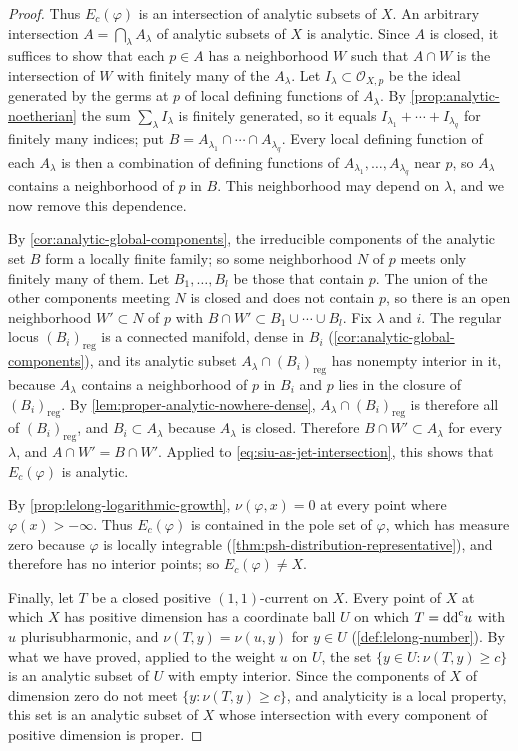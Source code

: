 \begin{proof}
Thus $E_c(\varphi)$ is an intersection of analytic subsets of $X$. An arbitrary intersection $A=\bigcap_\lambda A_\lambda$ of analytic subsets of $X$ is analytic. Since $A$ is closed, it suffices to show that each $p\in A$ has a neighborhood $W$ such that $A\cap W$ is the intersection of $W$ with finitely many of the $A_\lambda$. Let $I_\lambda\subset\mathcal O_{X,p}$ be the ideal generated by the germs at $p$ of local defining functions of $A_\lambda$. By \cref{prop:analytic-noetherian} the sum $\sum_\lambda I_\lambda$ is finitely generated, so it equals $I_{\lambda_1}+\cdots+I_{\lambda_q}$ for finitely many indices; put $B=A_{\lambda_1}\cap\cdots\cap A_{\lambda_q}$. Every local defining function of each $A_\lambda$ is then a combination of defining functions of $A_{\lambda_1},\ldots,A_{\lambda_q}$ near $p$, so $A_\lambda$ contains a neighborhood of $p$ in $B$. This neighborhood may depend on $\lambda$, and we now remove this dependence.

By \cref{cor:analytic-global-components}, the irreducible components of the analytic set $B$ form a locally finite family; so some neighborhood $N$ of $p$ meets only finitely many of them. Let $B_1,\ldots,B_l$ be those that contain $p$. The union of the other components meeting $N$ is closed and does not contain $p$, so there is an open neighborhood $W'\subset N$ of $p$ with $B\cap W'\subset B_1\cup\cdots\cup B_l$. Fix $\lambda$ and $i$. The regular locus $(B_i)_{\mathrm{reg}}$ is a connected manifold, dense in $B_i$ (\cref{cor:analytic-global-components}), and its analytic subset $A_\lambda\cap(B_i)_{\mathrm{reg}}$ has nonempty interior in it, because $A_\lambda$ contains a neighborhood of $p$ in $B_i$ and $p$ lies in the closure of $(B_i)_{\mathrm{reg}}$. By \cref{lem:proper-analytic-nowhere-dense}, $A_\lambda\cap(B_i)_{\mathrm{reg}}$ is therefore all of $(B_i)_{\mathrm{reg}}$, and $B_i\subset A_\lambda$ because $A_\lambda$ is closed. Therefore $B\cap W'\subset A_\lambda$ for every $\lambda$, and $A\cap W'=B\cap W'$. Applied to \eqref{eq:siu-as-jet-intersection}, this shows that $E_c(\varphi)$ is analytic.

By \cref{prop:lelong-logarithmic-growth}, $\nu(\varphi,x)=0$ at every point where $\varphi(x)>-\infty$. Thus $E_c(\varphi)$ is contained in the pole set of $\varphi$, which has measure zero because $\varphi$ is locally integrable (\cref{thm:psh-distribution-representative}), and therefore has no interior points; so $E_c(\varphi)\neq X$.

Finally, let $T$ be a closed positive $(1,1)$-current on $X$. Every point of $X$ at which $X$ has positive dimension has a coordinate ball $U$ on which $T=\mathrm{dd}^{\mathrm{c}} u$ with $u$ plurisubharmonic, and $\nu(T,y)=\nu(u,y)$ for $y\in U$ (\cref{def:lelong-number}). By what we have proved, applied to the weight $u$ on $U$, the set $\{y\in U:\nu(T,y)\geq c\}$ is an analytic subset of $U$ with empty interior. Since the components of $X$ of dimension zero do not meet $\{y:\nu(T,y)\geq c\}$, and analyticity is a local property, this set is an analytic subset of $X$ whose intersection with every component of positive dimension is proper.
\end{proof}

